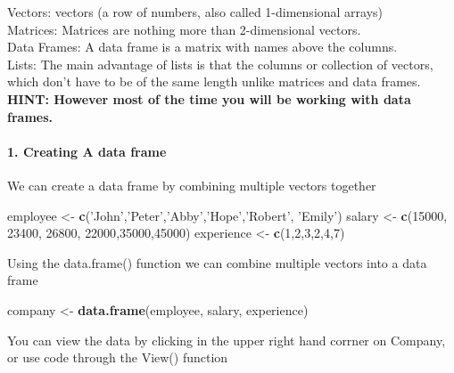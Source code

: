 \documentclass[]{article}
\newenvironment{Shaded}{\begin{snugshade}}{\end{snugshade}}
\newcommand{\KeywordTok}[1]{\textcolor[rgb]{0.13,0.29,0.53}{\textbf{#1}}}
\newcommand{\DecValTok}[1]{\textcolor[rgb]{0.00,0.00,0.81}{#1}}
\newcommand{\StringTok}[1]{\textcolor[rgb]{0.31,0.60,0.02}{#1}}
\newcommand{\NormalTok}[1]{#1}
\let\oldparagraph\paragraph
\renewcommand{\paragraph}[1]{\oldparagraph{#1}\mbox{}}
\begin{document}
Vectors: vectors (a row of numbers, also called 1-dimensional arrays)\\
Matrices: Matrices are nothing more than 2-dimensional vectors.\\
Data Frames: A data frame is a matrix with names above the columns.\\
Lists: The main advantage of lists is that the columns or collection of
vectors, which don't have to be of the same length unlike matrices and
data frames.\\
\textbf{HINT: However most of the time you will be working with data
frames.}

\paragraph{1. Creating A data frame}\label{creating-a-data-frame}

We can create a data frame by combining multiple vectors together

\begin{Shaded}
\begin{Highlighting}[]
\NormalTok{employee <-}\StringTok{ }\KeywordTok{c}\NormalTok{(}\StringTok{'John'}\NormalTok{,}\StringTok{'Peter'}\NormalTok{,}\StringTok{'Abby'}\NormalTok{,}\StringTok{'Hope'}\NormalTok{,}\StringTok{'Robert'}\NormalTok{, }\StringTok{'Emily'}\NormalTok{)}
\NormalTok{salary <-}\StringTok{ }\KeywordTok{c}\NormalTok{(}\DecValTok{15000}\NormalTok{, }\DecValTok{23400}\NormalTok{, }\DecValTok{26800}\NormalTok{, }\DecValTok{22000}\NormalTok{,}\DecValTok{35000}\NormalTok{,}\DecValTok{45000}\NormalTok{)}
\NormalTok{experience <-}\StringTok{ }\KeywordTok{c}\NormalTok{(}\DecValTok{1}\NormalTok{,}\DecValTok{2}\NormalTok{,}\DecValTok{3}\NormalTok{,}\DecValTok{2}\NormalTok{,}\DecValTok{4}\NormalTok{,}\DecValTok{7}\NormalTok{)}
\end{Highlighting}
\end{Shaded}

Using the data.frame() function we can combine multiple vectors into a
data frame

\begin{Shaded}
\begin{Highlighting}[]
\NormalTok{company <-}\StringTok{ }\KeywordTok{data.frame}\NormalTok{(employee, salary, experience)}
\end{Highlighting}
\end{Shaded}

You can view the data by clicking in the upper right hand corrner on
Company, or use code through the View() function
\end{document}

